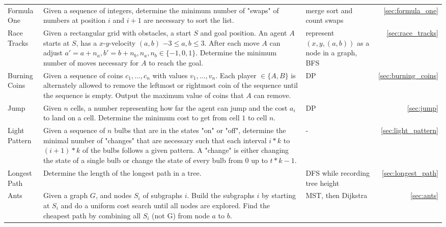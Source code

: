 \documentclass[a4paper, 10pt]{article}
\begin{document}
\begin{longtable}{ L{2cm} L{7cm} L{3cm} r}
        Formula One 
        & Given a sequence of integers, determine the minimum number of "swaps" of numbers at position $i$ and $i+1$ are necessary to sort the list. 
        & merge sort and count swaps &  \ref{sec:formula_one} \\

        Race Tracks 
        & Given a rectangular grid with obstacles, a start $S$ and goal position. An agent $A$ starts at $S$, has a $x$-$y$-velocity $(a,b)$ 
            $-3\leq a,b \leq3$. After each move $A$ can adjust $a'=a+n_a, b'=b+n_b, n_a,n_b \in \{-1,0,1\}$. 
            Determine the minimum number of moves necessary for $A$ to reach the goal. 
        & represent $(x,y,(a,b))$ as a node in a graph, BFS &  \ref{sec:race_tracks} \\

        Burning Coins 
        & Given a sequence of coins $c_1, \dots, c_n$ with values $v_1,\dots,v_n$. 
            Each player $\in \{A,B\}$ is alternately allowed to remove the leftmost or rightmost coin of the sequence until the sequence is empty. 
            Output the maximum value of coins that $A$ can remove. 
        & DP &  \ref{sec:burning_coins} \\

        Jump 
        & Given $n$ cells, a number representing how far the agent can jump and the cost $a_i$ to land on a cell. 
            Determine the minimum cost to get from cell $1$ to cell $n$.        
        & DP &  \ref{sec:jump} \\

        Light Pattern 
        & Given a sequence of $n$ bulbs that are in the states "on" or "off", determine the minimal number of "changes" that are necessary such that  
            each interval $i*k$ to $(i+1)*k$ of the bulbs follows a given pattern. A "change" is either changing the state of a single bulb or
            change the state of every  bulb from $0$ up to $t*k-1$.
        & - &  \ref{sec:light_pattern} \\

        Longest Path 
        & Determine the length of the longest path in a tree.
        & DFS while recording tree height &  \ref{sec:longest_path} \\

        Ants 
        & Given a graph $G$, and nodes $S_i$ of subgraphs $i$. 
            Build the subgraphs $i$ by starting at $S_i$ and do a uniform cost search until all nodes are explored.
            Find the cheapest path by combining all $S_i$ (not G) from node $a$ to $b$. 
        & MST, then Dijkstra &  \ref{sec:ants} \\


\end{longtable}
\end{document}
